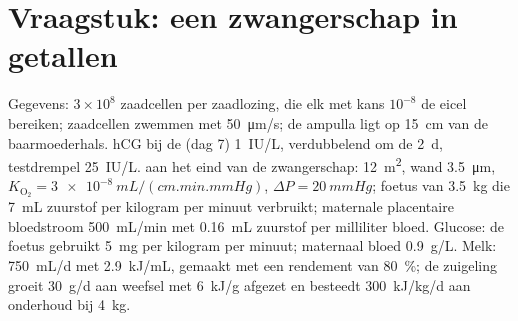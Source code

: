 \section{Vraagstuk: een zwangerschap in getallen}

\begin{problem}
\label{pb:b2:mammal-reproduction:1}
Gegevens: $3\times 10^{8}$ zaadcellen per zaadlozing, die elk met kans
$10^{-8}$ de eicel bereiken; zaadcellen zwemmen met \qty{50}{\micro m/s};
de ampulla ligt op \qty{15}{cm} van de baarmoederhals. hCG bij de
 (dag 7) \qty{1}{IU/L}, verdubbelend om de \qty{2}{d},
testdrempel \qty{25}{IU/L}.  aan het eind van de zwangerschap:
\qty{12}{m^2}, wand
\qty{3.5}{\micro m}, $K_{\mathrm{O_2}} = \qty{3e-8}{mL/(cm.min.mmHg)}$,
$\Delta P = \qty{20}{mmHg}$; foetus van \qty{3.5}{kg} die
\qty{7}{mL} zuurstof per kilogram per minuut verbruikt; maternale
placentaire bloedstroom \qty{500}{mL/min} met \qty{0.16}{mL} zuurstof per
milliliter bloed. Glucose: de foetus gebruikt \qty{5}{mg} per kilogram per
minuut; maternaal bloed \qty{0.9}{g/L}. Melk: \qty{750}{mL/d} met
\qty{2.9}{kJ/mL}, gemaakt met een rendement van \qty{80}{\%}; de zuigeling
groeit \qty{30}{g/d} aan weefsel met \qty{6}{kJ/g} afgezet en besteedt
\qty{300}{kJ/kg/d} aan onderhoud bij \qty{4}{kg}.


\end{problem}
